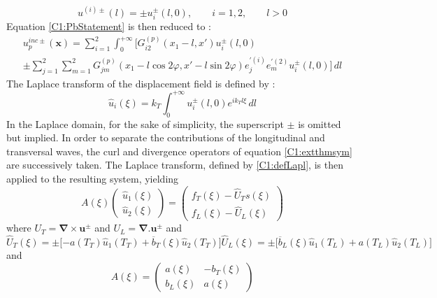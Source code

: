 \begin{equation}
u^{(i)\pm}(l)=\pm u_i^\pm(l,0), \hspace{2em} i=1,2, \hspace{2em} l>0
\end{equation}
Equation \eqref{C1:PbStatement} is then reduced to :
\begin{multline}
u_p^{inc \pm}(\mathbf{x})=\sum_{i=1}^2\int_0^{+\infty}\Big[ G_{i2}^{(p)}(x_1-l,x')u_i^\pm(l,0)\\
\pm\sum_{j=1}^2\sum_{m=1}^2G_{jm}^{(p)}(x_1-l\cos 2\varphi,x'-l\sin 2\varphi)e_j^{\prime (i)}e_m^{\prime (2)}u_i^\pm(l,0) \Big] \, dl
\label{C1:extthmsym}
\end{multline}
The Laplace transform of the displacement field is defined by :
\begin{equation}
\hat{u}_i(\xi)=k_T\int_0^{+\infty}u_i^\pm(l,0)e^{ik_Tl\xi}\, dl
\label{C1:defLapl}
\end{equation}
In the Laplace domain, for the sake of simplicity, the superscript $\pm$ is omitted but implied. In order to separate the contributions of the longitudinal and transversal waves, the curl and divergence operators of equation \eqref{C1:extthmsym} are successively taken. The Laplace transform, defined by \eqref{C1:defLapl}, is then applied to the resulting system, yielding
\begin{equation}
A(\xi)\begin{pmatrix}
\hat{u}_1(\xi)\\
\hat{u}_2(\xi)
\end{pmatrix}
= \begin{pmatrix}
f_T(\xi)-\hat{U}_Ts(\xi)\\
f_L(\xi)-\hat{U}_L(\xi)
\end{pmatrix}
\label{C1:LTsyst}
\end{equation}
where $U_T=\mathbf{\nabla}\times\mathbf{u}^\pm$ and $U_L=\mathbf{\nabla}.\mathbf{u}^\pm$ and 
\begin{subequations}
\begin{equation}
\hat{U}_T(\xi)=\pm\lbrack -a(T_T)\hat{u}_1(T_T)+\overline{b}_T(\xi)\hat{u}_2(T_T) \rbrack
\end{equation}
\begin{equation}
\hat{U}_L(\xi)=\pm\lbrack \overline{b}_L(\xi)\hat{u}_1(T_L)+a(T_L)\hat{u}_2(T_L) \rbrack
\end{equation}
\label{C1:ULUT}
\end{subequations}
and
\begin{equation}
A(\xi)=\begin{pmatrix}
a(\xi)&-b_T(\xi)\\
b_L(\xi)&a(\xi)
\end{pmatrix}
\label{C1:matA}
\end{equation}
